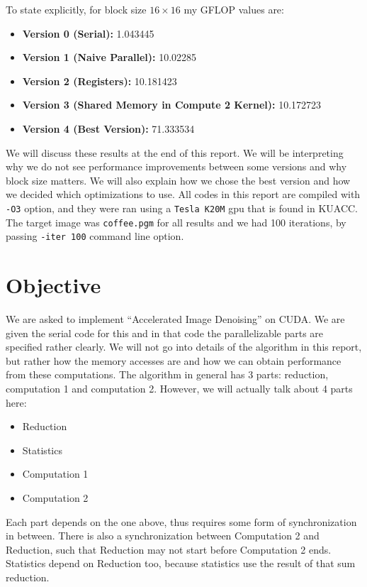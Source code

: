 \documentclass[12pt,reqno]{amsart}
\newcommand{\code}[1]{\texttt{#1}}
\begin{document}
To state explicitly, for block size $16\times16$ my GFLOP values are:
\begin{itemize}
	\item \textbf{Version 0 (Serial):} 1.043445
	\item \textbf{Version 1 (Naive Parallel):} 10.02285
	\item \textbf{Version 2 (Registers):} 10.181423
	\item \textbf{Version 3 (Shared Memory in Compute 2 Kernel):} 10.172723
	\item \textbf{Version 4 (Best Version):} 71.333534
\end{itemize}
We will discuss these results at the end of this report. We will be interpreting why we do not see performance improvements between some versions and why block size matters. We will also explain how we chose the best version and how we decided which optimizations to use. 
All codes in this report are compiled with \code{-O3} option, and they were ran using a \code{Tesla K20M} gpu that is found in KUACC. The target image was \code{coffee.pgm} for all results and we had 100 iterations, by passing \code{-iter 100} command line option.

\section{Objective}

We are asked to implement ``Accelerated Image Denoising'' on CUDA. We are given the serial code for this and in that code the parallelizable parts are specified rather clearly. We will not go into details of the algorithm in this report, but rather how the memory accesses are and how we can obtain performance from these computations. The algorithm in general has 3 parts: reduction, computation 1 and computation 2. However, we will actually talk about 4 parts here:
\begin{itemize}
	\item Reduction
	\item Statistics
	\item Computation 1
	\item Computation 2
\end{itemize}
Each part depends on the one above, thus requires some form of synchronization in between. There is also a synchronization between Computation 2 and Reduction, such that Reduction may not start before Computation 2 ends. Statistics depend on Reduction too, because statistics use the result of that sum reduction.
\end{document}
